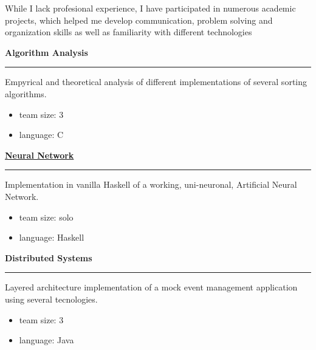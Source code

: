 \documentclass [10pt, a4paper] {extarticle}
\newcommand{\rightcolumwidth}{
    0.82
}
\begin{document}
    \begin {flushright}
    \begin {minipage} [t] {\rightcolumwidth\textwidth}
        While I lack profesional experience, I have participated in numerous academic projects, which helped me develop communication, problem solving and organization skills as well as familiarity with different technologies \\ [7px]
        \begin {minipage} [t] {0.3\textwidth}
            \textbf {Algorithm Analysis} \\ [-5px]
            \hrule
            \vspace {4px} Empyrical and theoretical analysis of different implementations of several sorting algorithms.
            \vspace {-4px}
            \begin {itemize} [noitemsep]
            \item team size: 3
            \item language: C
            \end {itemize}
        \end {minipage}
        \hfill
        \begin {minipage} [t] {0.3\textwidth}
            \href {https://github.com/yref-boop/ann} {\textbf {Neural Network}} \\ [-5px]
            \hrule
            \vspace {4px} Implementation in vanilla Haskell of a working, uni-neuronal, Artificial Neural Network.
            \vspace {-4px}
            \begin {itemize} [noitemsep]
                \item team size: solo
                \item language: Haskell
            \end {itemize}
        \end {minipage}
        \hfill
        \begin {minipage} [t] {0.3\textwidth}
            \textbf {Distributed Systems} \\ [-5px]
            \hrule
            \vspace {4px} Layered architecture implementation of a mock event management application using several tecnologies.
            \vspace {-4px}
            \begin {itemize} [noitemsep]
                \item team size: 3
                \item language: Java
            \end {itemize}
        \end {minipage}
    \end {minipage}
    \end {flushright}
\end{document}
